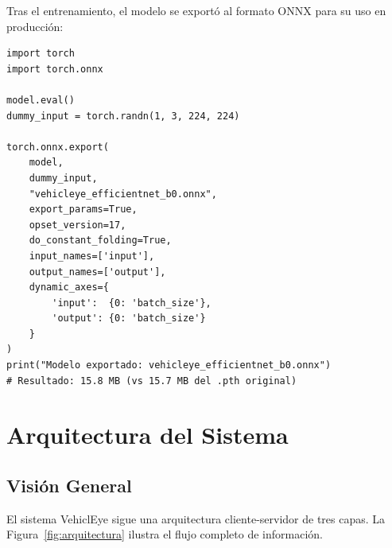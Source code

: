 \documentclass[12pt,a4paper]{article}
\begin{document}
Tras el entrenamiento, el modelo se exportó al formato ONNX para su uso en producción:

\begin{lstlisting}[caption={Exportación del modelo a formato ONNX}, label={lst:onnxexport}]
import torch
import torch.onnx

model.eval()
dummy_input = torch.randn(1, 3, 224, 224)

torch.onnx.export(
    model,
    dummy_input,
    "vehicleye_efficientnet_b0.onnx",
    export_params=True,
    opset_version=17,
    do_constant_folding=True,
    input_names=['input'],
    output_names=['output'],
    dynamic_axes={
        'input':  {0: 'batch_size'},
        'output': {0: 'batch_size'}
    }
)
print("Modelo exportado: vehicleye_efficientnet_b0.onnx")
# Resultado: 15.8 MB (vs 15.7 MB del .pth original)
\end{lstlisting}

\section{Arquitectura del Sistema}

\subsection{Visión General}

El sistema VehiclEye sigue una arquitectura cliente-servidor de tres capas. La Figura~\ref{fig:arquitectura} ilustra el flujo completo de información.
\end{document}
